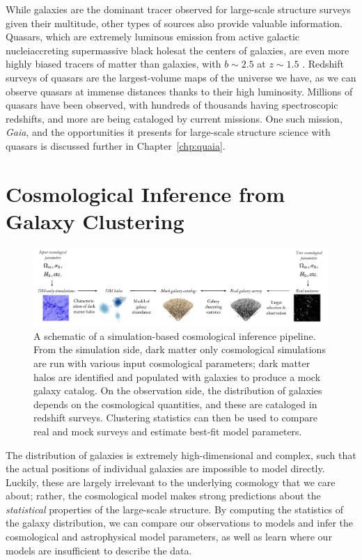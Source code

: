 While galaxies are the dominant tracer observed for large-scale structure surveys given their multitude, other types of sources also provide valuable information.
Quasars, which are extremely luminous emission from active galactic nuclei{\emdash}accreting supermassive black holes{\emdash}at the centers of galaxies, are even more highly biased tracers of matter than galaxies, with $b \sim 2.5$ at $z \sim 1.5$ \citep{laurent_clustering_2017-3}.
Redshift surveys of quasars are the largest-volume maps of the universe we have, as we can observe quasars at immense distances thanks to their high luminosity.
Millions of quasars have been observed, with hundreds of thousands having spectroscopic redshifts, and more are being cataloged by current missions.
One such mission, \emph{Gaia}, and the opportunities it presents for large-scale structure science with quasars is discussed further in Chapter~\ref{chp:quaia}.



\section{Cosmological Inference from Galaxy Clustering}

\begin{figure}
    \centering
    \includegraphics[width=\textwidth]{cosmo_inference.pdf}
    \caption{A schematic of a simulation-based cosmological inference pipeline. From the simulation side, dark matter only cosmological simulations are run with various input cosmological parameters; dark matter halos are identified and populated with galaxies to produce a mock galaxy catalog. On the observation side, the distribution of galaxies depends on the cosmological quantities, and these are cataloged in redshift surveys. Clustering statistics can then be used to compare real and mock surveys and estimate best-fit model parameters.}
    \label{fig:cosmo_inf}
\end{figure}

The distribution of galaxies is extremely high-dimensional and complex, such that the actual positions of individual galaxies are impossible to model directly.
Luckily, these are largely irrelevant to the underlying cosmology that we care about; rather, the cosmological model makes strong predictions about the \emph{statistical} properties of the large-scale structure.
By computing the statistics of the galaxy distribution, we can compare our observations to models and infer the cosmological and astrophysical model parameters, as well as learn where our models are insufficient to describe the data.

